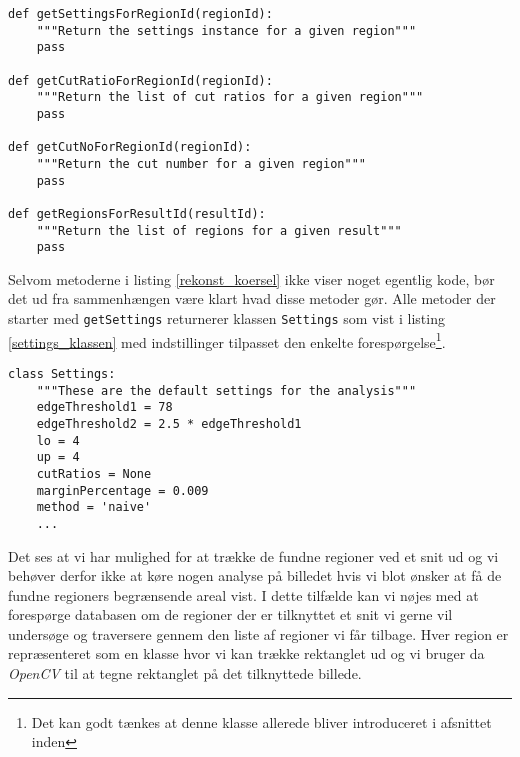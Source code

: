 {\begin{lstlisting}[caption={Metoder til rekonstruktion af kørsler},captionpos=b,label={rekonst_koersel},numbers=none]
def getSettingsForRegionId(regionId):
    """Return the settings instance for a given region"""
    pass

def getCutRatioForRegionId(regionId):
    """Return the list of cut ratios for a given region"""
    pass

def getCutNoForRegionId(regionId):
    """Return the cut number for a given region"""
    pass

def getRegionsForResultId(resultId):
    """Return the list of regions for a given result"""
    pass
\end{lstlisting}

Selvom metoderne i listing \ref{rekonst_koersel} ikke viser noget
egentlig kode, bør det ud fra sammenhængen være klart hvad disse metoder
gør. Alle metoder der starter med \texttt{getSettings} returnerer
klassen \texttt{Settings} som vist i listing \ref{settings_klassen} med
indstillinger tilpasset den enkelte forespørgelse\footnote{Det kan godt tænkes
at denne klasse allerede bliver introduceret i afsnittet inden}.

\vspace{0.5cm}
\begin{lstlisting}[caption={Settings-klassen med standardindstillinger},captionpos=b,label={settings_klassen},numbers=none]
class Settings:
    """These are the default settings for the analysis"""
    edgeThreshold1 = 78
    edgeThreshold2 = 2.5 * edgeThreshold1
    lo = 4
    up = 4
    cutRatios = None
    marginPercentage = 0.009
    method = 'naive'
    ...
\end{lstlisting}

Det ses at vi har mulighed for at trække de fundne regioner ved et
snit ud og vi behøver derfor ikke at køre nogen analyse på billedet hvis
vi blot ønsker at få de fundne regioners begrænsende areal vist. I dette
tilfælde kan vi nøjes med at forespørge databasen om de regioner der er
tilknyttet et snit vi gerne vil undersøge og traversere gennem den liste
af regioner vi får tilbage. Hver region er repræsenteret som en klasse
hvor vi kan trække rektanglet ud og vi bruger da \emph{OpenCV} til at
tegne rektanglet på det tilknyttede billede.
}


